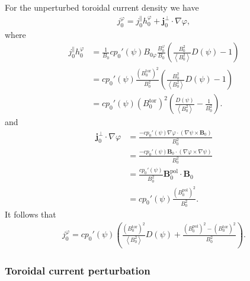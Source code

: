 \documentclass[a4paper, 10pt, english]{article}
\let\temp\varrho
\let\varrho\rho
\let\rho\temp
\let\temp\vartheta
\let\vartheta\theta
\let\theta\temp
\let\temp\varphi
\let\varphi\phi
\let\phi\temp
\let\vec\symbf
\newcommand*\pol{\ensuremath{\textrm{pol}}}  %
\newcommand*\tor{\ensuremath{\textrm{tor}}}  %
\begin{document}
For the unperturbed toroidal current density we have
\begin{gather}
  j_{0}^{\phi} = j_{0}^{\parallel} h_{0}^{\phi} + \vec{j}_{0}^{\perp} \cdot \nabla \phi,
\end{gather}
where
\begin{align}
  j_{0}^{\parallel} h_{0}^{\phi} &= \frac{1}{B_{0}} c p_{0}'(\psi) B_{0 \phi} \frac{B_{0}^{\phi}}{B_{0}} \left( \frac{B_{0}^{2}}{\left\langle B_{0}^{2} \right\rangle} D(\psi) - 1 \right) \nonumber \\
  &= c p_{0}'(\psi) \frac{\left( B_{0}^{\tor} \right)^{2}}{B_0^2} \left( \frac{B_{0}^{2}}{\left\langle B_{0}^{2} \right\rangle} D(\psi) - 1 \right) \nonumber \\
  &= c p_{0}'(\psi) \left( B_{0}^{\tor} \right)^{2} \left( \frac{D(\psi)}{\left\langle B_{0}^{2} \right\rangle} - \frac{1}{B_{0}^{2}} \right).
\end{align}
and
\begin{align}
  \vec{j}_{0}^{\perp} \cdot \nabla \phi &= \frac{-c p_{0}'(\psi) \nabla \phi \cdot (\nabla \psi \times \vec{B}_{0})}{B_{0}^{2}} \nonumber \\
  &= \frac{-c p_{0}'(\psi) \vec{B}_{0} \cdot (\nabla \phi \times \nabla \psi)}{B_{0}^{2}} \\
  &= \frac{c p_{0}'(\psi)}{B_{0}^{2}} \vec{B}_{0}^{\pol} \cdot \vec{B}_{0} \nonumber \\
  &= c p_{0}'(\psi) \frac{\left( B_{0}^{\pol} \right)^{2}}{B_{0}^{2}}.
\end{align}
It follows that
\begin{gather}
  j_{0}^{\phi} = c p_{0}'(\psi) \left( \frac{\left( B_{0}^{\tor} \right)^{2}}{\left\langle B_{0}^{2} \right\rangle} D(\psi) + \frac{\left( B_{0}^{\pol} \right)^2 - \left( B_{0}^{\tor} \right)^2}{B_{0}^{2}} \right).
\end{gather}

\subsubsection{Toroidal current perturbation}
\end{document}
